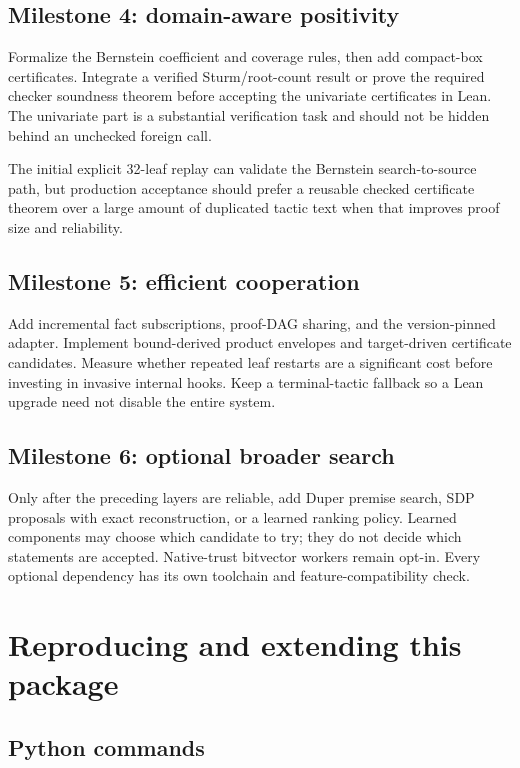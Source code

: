 \subsection{Milestone 4: domain-aware positivity}

Formalize the Bernstein coefficient and coverage rules, then add compact-box certificates. Integrate a verified Sturm/root-count result or prove the required checker soundness theorem before accepting the univariate certificates in Lean. The univariate part is a substantial verification task and should not be hidden behind an unchecked foreign call.

The initial explicit 32-leaf replay can validate the Bernstein search-to-source path, but production acceptance should prefer a reusable checked certificate theorem over a large amount of duplicated tactic text when that improves proof size and reliability.

\subsection{Milestone 5: efficient cooperation}

Add incremental fact subscriptions, proof-DAG sharing, and the version-pinned \grind{} adapter. Implement bound-derived product envelopes and target-driven certificate candidates. Measure whether repeated leaf restarts are a significant cost before investing in invasive internal hooks. Keep a terminal-tactic fallback so a Lean upgrade need not disable the entire system.

\subsection{Milestone 6: optional broader search}

Only after the preceding layers are reliable, add Duper premise search, SDP proposals with exact reconstruction, or a learned ranking policy. Learned components may choose which candidate to try; they do not decide which statements are accepted. Native-trust bitvector workers remain opt-in. Every optional dependency has its own toolchain and feature-compatibility check.

\section{Reproducing and extending this package}

\subsection{Python commands}

